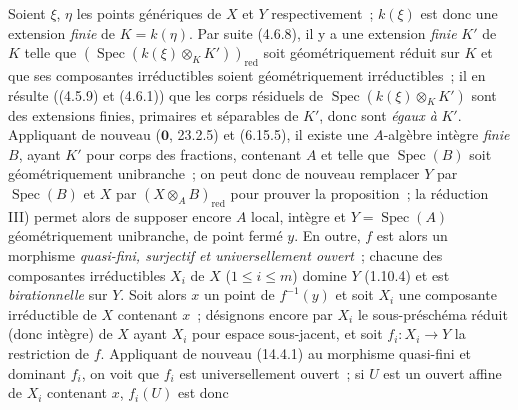 Soient $\xi$, $\eta$ les points génériques de $X$ et $Y$ respectivement~;
$k(\xi)$ est donc une extension \emph{finie} de $K=k(\eta)$. Par suite (4.6.8), il
y a une extension \emph{finie} $K'$ de $K$ telle que
$(\operatorname{Spec}(k(\xi)\otimes_K K'))_{\mathrm{red}}$ soit géométriquement réduit sur $K$ et
que ses composantes irréductibles soient géométriquement irréductibles~; il en
résulte ((4.5.9) et (4.6.1)) que les corps résiduels de
$\operatorname{Spec}(k(\xi)\otimes_K K')$ sont des extensions finies, primaires et séparables de
$K'$, donc sont \emph{égaux à} $K'$. Appliquant de nouveau ($\mathbf 0$, 23.2.5) et
(6.15.5), il existe une $A$-algèbre intègre \emph{finie} $B$, ayant $K'$ pour
corps des fractions, contenant $A$ et telle que $\operatorname{Spec}(B)$ soit géométriquement
unibranche~; on peut donc de nouveau remplacer $Y$ par $\operatorname{Spec}(B)$ et $X$ par
$(X\otimes_A B)_{\mathrm{red}}$ pour prouver la proposition~; la réduction III)
permet alors de supposer encore $A$ local, intègre et $Y=\operatorname{Spec}(A)$ géométriquement
unibranche, de point fermé $y$. En outre, $f$ est alors un morphisme \emph{quasi-fini,
surjectif et universellement ouvert}~; chacune des composantes irréductibles $X_i$
de $X$ ($1\leq i\leq m$) domine $Y$ (1.10.4) et est \emph{birationnelle} sur $Y$.
Soit alors $x$ un point de $f^{-1}(y)$ et soit $X_i$ une composante irréductible de
$X$ contenant $x$~; désignons encore par $X_i$ le sous-préschéma réduit (donc
intègre) de $X$ ayant $X_i$ pour espace sous-jacent, et soit $f_i:X_i\to Y$ la
restriction de $f$. Appliquant de nouveau (14.4.1) au morphisme quasi-fini et
dominant $f_i$, on voit que $f_i$ est universellement ouvert~; si $U$ est un ouvert
affine de $X_i$ contenant $x$, $f_i(U)$ est donc

